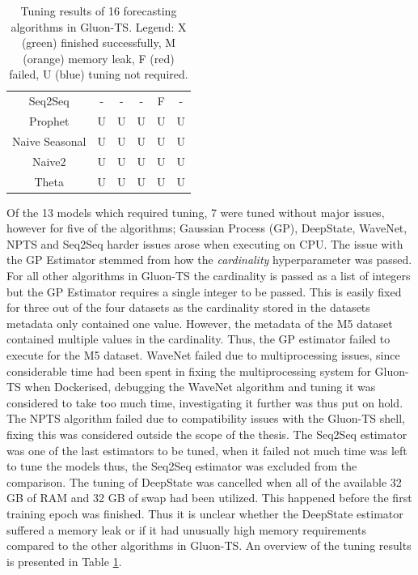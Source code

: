\begin{table}[htb]
\begin{tabular}{cccccc}
    Seq2Seq           & -                     & -                      & -                    & \cellcolor{red}F     & -                           \\
    Prophet           & \cellcolor{blue!25}U  & \cellcolor{blue!25}U   & \cellcolor{blue!25}U & \cellcolor{blue!25}U & \cellcolor{blue!25}U        \\
    Naive Seasonal    & \cellcolor{blue!25}U  & \cellcolor{blue!25}U   & \cellcolor{blue!25}U & \cellcolor{blue!25}U & \cellcolor{blue!25}U        \\
    Naive2            & \cellcolor{blue!25}U  & \cellcolor{blue!25}U   & \cellcolor{blue!25}U & \cellcolor{blue!25}U & \cellcolor{blue!25}U        \\
    Theta             & \cellcolor{blue!25}U  & \cellcolor{blue!25}U   & \cellcolor{blue!25}U & \cellcolor{blue!25}U & \cellcolor{blue!25}U        \\
    \hline
  \end{tabular}
  \caption{Tuning results of 16 forecasting algorithms in Gluon-TS. Legend: X (green) finished successfully, M (orange) memory leak, F (red) failed, U (blue) tuning not required.}
  \label{tab:tuning_results}
\end{table}

Of the 13 models which required tuning, 7 were tuned without major issues, however for five of the algorithms; Gaussian Process (GP), DeepState, WaveNet, NPTS and Seq2Seq harder issues arose when executing on CPU. The issue with the GP Estimator stemmed from how the \textit{cardinality} hyperparameter was passed. For all other algorithms in Gluon-TS the cardinality is passed as a list of integers but the GP Estimator requires a single integer to be passed. This is easily fixed for three out of the four datasets as the cardinality stored in the datasets metadata only contained one value. However, the metadata of the M5 dataset contained multiple values in the cardinality. Thus, the GP estimator failed to execute for the M5 dataset. WaveNet failed due to multiprocessing issues, since considerable time had been spent in fixing the multiprocessing system for Gluon-TS when Dockerised, debugging the WaveNet algorithm and tuning it was considered to take too much time, investigating it further was thus put on hold. The NPTS algorithm failed due to compatibility issues with the Gluon-TS shell, fixing this was considered outside the scope of the thesis. The Seq2Seq estimator was one of the last estimators to be tuned, when it failed not much time was left to tune the models thus, the Seq2Seq estimator was excluded from the comparison. The tuning of DeepState was cancelled when all of the available 32 GB of RAM and 32 GB of swap had been utilized. This happened before the first training epoch was finished. Thus it is unclear whether the DeepState estimator suffered a memory leak or if it had unusually high memory requirements compared to the other algorithms in Gluon-TS. An overview of the tuning results is presented in Table \ref{tab:tuning_results}.

